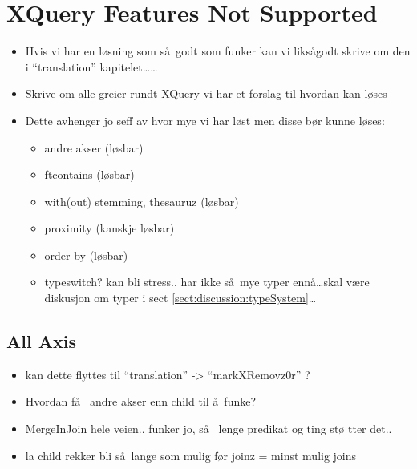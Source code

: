 \section{XQuery Features Not Supported}
\label{sect:discussion:notSupported}
\begin{itemize}
  \item Hvis vi har en l\o sning som s\aa~godt som funker kan vi liks\aa godt skrive om den i ``translation''
  kapitelet\ldots\ldots
  \item Skrive om alle greier rundt XQuery vi har et forslag til hvordan kan
  l\o ses
  \item Dette avhenger jo seff av hvor mye vi har l\o st men disse b\o r kunne
  l\o ses:
  	\begin{itemize}
  		\item andre akser (l\o sbar)
  		\item ftcontains (l\o sbar)
  		\item with(out) stemming, thesauruz (l\o sbar)
  		\item proximity (kanskje l\o sbar)
  		\item order by (l\o sbar)
  		\item typeswitch? kan bli stress.. har ikke s\aa~mye typer enn\aa \ldots skal v\ae re diskusjon om typer i
  		sect \ref{sect:discussion:typeSystem}\ldots
  		\end{itemize}
	\end{itemize}

\subsection{All Axis}
\label{sect:discussion:notAxis}
\begin{itemize}
  \item kan dette flyttes til ``translation'' -> ``markXRemovz0r'' ?
  \item Hvordan f\aa~ andre akser enn child til \aa~funke?
  \item MergeInJoin hele veien.. funker jo, s\aa~ lenge predikat og ting st\o
  tter det..
  \item la child rekker bli s\aa~lange som mulig f\o r joinz = minst mulig joins
\end{itemize}